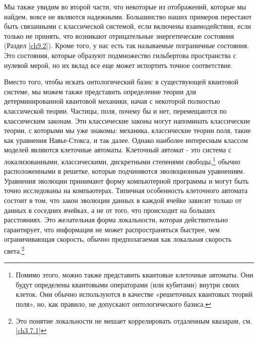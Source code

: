 \documentclass[main.tex]{subfiles}
\begin{document}
Мы также увидим во второй части, что некоторые из отображений, которые мы найдем, вовсе не являются надежными. Большинство наших примеров перестают быть связанными с классической системой, если включены взаимодействия, если только не принять, что возникают отрицательные энергетические состояния (Раздел \ref{ch9.2}). Кроме того, у нас есть так называемые пограничные состояния. Это состояния, которые образуют подмножество гильбертова пространства с нулевой мерой, но их вклад все еще может испортить точное соответствие.

Вместо того, чтобы искать онтологический базис в существующей квантовой системе, мы можем также представить определение теории для детерминированной квантовой механики, начав с некоторой полностью классической теории. Частицы, поля, почему бы и нет, перемещаются по классическим законам. Эти классические законы могут напоминать классические теории, с которыми мы уже знакомы: механика, классические теории поля, такие как уравнения Навье-Стокса, и так далее. Однако наиболее интересным классом моделей являются клеточные автоматы. Клеточный автомат - это система с локализованными, классическими, дискретными степенями свободы,\footnote{Помимо этого, можно также представить квантовые клеточные автоматы. Они будут определены квантовыми операторами (или кубитами) внутри своих клеток. Они обычно используются в качестве «решеточных квантовых теорий поля», но, как правило, не допускают онтологического базиса.} обычно расположенными в решетке, которые подчиняются эволюционным уравнениям. Уравнения эволюции принимают форму компьютерной программы и могут быть точно исследованы на компьютерах. Типичная особенность клеточного автомата состоит в том, что закон эволюции данных в каждой ячейке зависит только от данных в соседних ячейках, а не от того, что происходит на больших расстояниях. Это желательная форма локальности, которая действительно гарантирует, что информация не может распространяться быстрее, чем ограничивающая скорость, обычно предполагаемая как локальная скорость света.\footnote{Это понятие локальности не мешает коррелировать отдаленным квазарам, см. \ref{ch3.7.1}}
\end{document}
